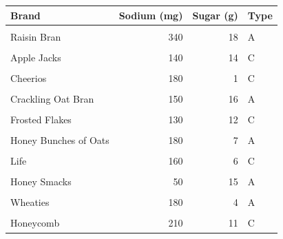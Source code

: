 \documentclass[
]{article}
\begin{document}
\begin{table}[H]
\centering\centering\centering
\begin{tabular}{l|r|r|>{\raggedright\arraybackslash}p{18em}}
\hline
Brand & Sodium (mg) & Sugar (g) & Type\\
\hline
\cellcolor{gray!10}{Frosted Mini Wheats} & \cellcolor{gray!10}{0} & \cellcolor{gray!10}{11} & \cellcolor{gray!10}{A}\\
\hline
Raisin Bran & 340 & 18 & A\\
\hline
\cellcolor{gray!10}{All Bran} & \cellcolor{gray!10}{70} & \cellcolor{gray!10}{5} & \cellcolor{gray!10}{A}\\
\hline
Apple Jacks & 140 & 14 & C\\
\hline
\cellcolor{gray!10}{Captain Crunch} & \cellcolor{gray!10}{200} & \cellcolor{gray!10}{12} & \cellcolor{gray!10}{C}\\
\hline
Cheerios & 180 & 1 & C\\
\hline
\cellcolor{gray!10}{Cinnamon Toast Crunch} & \cellcolor{gray!10}{210} & \cellcolor{gray!10}{10} & \cellcolor{gray!10}{C}\\
\hline
Crackling Oat Bran & 150 & 16 & A\\
\hline
\cellcolor{gray!10}{Fiber One} & \cellcolor{gray!10}{100} & \cellcolor{gray!10}{0} & \cellcolor{gray!10}{A}\\
\hline
Frosted Flakes & 130 & 12 & C\\
\hline
\cellcolor{gray!10}{Froot Loops} & \cellcolor{gray!10}{140} & \cellcolor{gray!10}{14} & \cellcolor{gray!10}{C}\\
\hline
Honey Bunches of Oats & 180 & 7 & A\\
\hline
\cellcolor{gray!10}{Honey Nut Cheerios} & \cellcolor{gray!10}{190} & \cellcolor{gray!10}{9} & \cellcolor{gray!10}{C}\\
\hline
Life & 160 & 6 & C\\
\hline
\cellcolor{gray!10}{Rice Krispies} & \cellcolor{gray!10}{290} & \cellcolor{gray!10}{3} & \cellcolor{gray!10}{C}\\
\hline
Honey Smacks & 50 & 15 & A\\
\hline
\cellcolor{gray!10}{Special K} & \cellcolor{gray!10}{220} & \cellcolor{gray!10}{4} & \cellcolor{gray!10}{A}\\
\hline
Wheaties & 180 & 4 & A\\
\hline
\cellcolor{gray!10}{Corn Flakes} & \cellcolor{gray!10}{200} & \cellcolor{gray!10}{3} & \cellcolor{gray!10}{A}\\
\hline
Honeycomb & 210 & 11 & C\\
\hline
\end{tabular}
\end{table}
\end{document}
